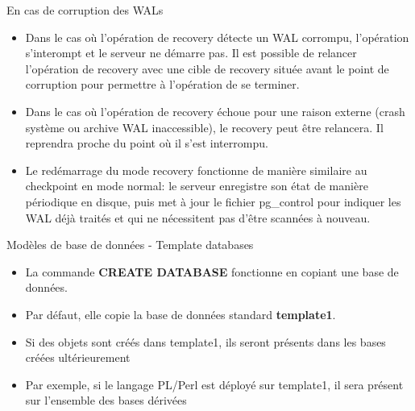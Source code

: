 \begin{frame}[fragile]{En cas de corruption des WALs}

\begin{itemize}

   \item Dans le cas où l'opération de recovery détecte un WAL corrompu, l'opération s'interompt et le serveur ne démarre pas. Il est possible de relancer l'opération de recovery avec une cible de recovery située avant le point de corruption pour permettre à l'opération de se terminer.
   \item Dans le cas où l'opération de recovery échoue pour une raison externe (crash système ou archive WAL inaccessible), le recovery peut être relancera. Il reprendra proche du point où il s'est interrompu.
   \item Le redémarrage du mode recovery fonctionne de manière similaire au checkpoint en mode normal: le serveur enregistre son état de manière périodique en disque, puis met à jour le fichier pg\_control pour indiquer les WAL déjà traités et qui ne nécessitent pas d'être scannées à nouveau.
\end{itemize}

\begin{toile}
\end{toile}

\end{frame}


\begin{frame}[fragile]{Modèles de base de données - Template databases}

\begin{itemize}
   \item La commande \textbf{CREATE DATABASE} fonctionne en copiant une base de données.
   \item Par défaut, elle copie la base de données standard \textbf{template1}.
   \item Si des objets sont créés dans template1, ils seront présents dans les bases créées ultérieurement
   \item Par exemple, si le langage PL/Perl est déployé sur template1, il sera présent sur l'ensemble des bases dérivées
\end{itemize}

\begin{toile}
\end{toile}

\end{frame}

